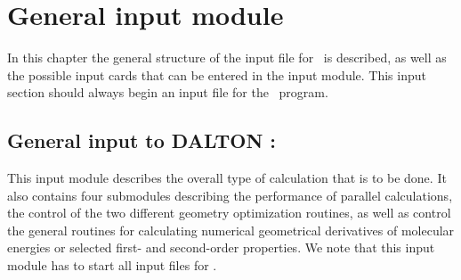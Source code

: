 \chapter{General input module}\label{ch:general}

In this chapter the general structure of the input file for \siraba\
is described, as well as the possible input cards that can be entered in
the \Sec{*DALTON} input module. This input section should always begin an
input file for the \siraba\ program.

\section{General input to DALTON : }\label{sec:general}

This input module describes the overall type of calculation that is to
be done. It also contains four submodules describing the
performance of parallel calculations, the control of the two different geometry optimization 
routines, as well as control the general routines for calculating
numerical geometrical derivatives of molecular energies or selected
first- and second-order properties. We note that this input module has
to start all input files for \siraba .

